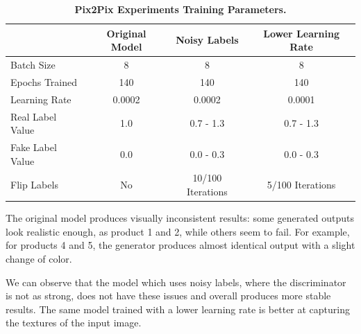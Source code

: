 \documentclass[12pt]{report}
\begin{document}
\begin{table}[h]
\centering
\begin{tabular}{@{}lccc@{}}
\toprule
                 & Original Model & Noisy Labels      & Lower Learning Rate \\ \midrule
Batch Size       & 8              & 8                 & 8                   \\
Epochs Trained   & 140            & 140               & 140                 \\
Learning Rate    & 0.0002         & 0.0002            & 0.0001              \\
Real Label Value & 1.0            & 0.7 - 1.3         & 0.7 - 1.3           \\
Fake Label Value & 0.0            & 0.0 - 0.3         & 0.0 - 0.3           \\
Flip Labels    & No             & 10/100 Iterations & 5/100 Iterations    \\ \bottomrule
\end{tabular}
\caption{\label{tab:pix2pix_exp} \textbf{Pix2Pix Experiments Training Parameters.}}
\end{table}

\pagebreak
The original model produces visually inconsistent results: some generated outputs look realistic enough, as product 1 and 2, while others seem to fail. For example, for products 4 and 5, the generator produces almost identical output with a slight change of color.

We can observe that the model which uses noisy labels, where the discriminator is not as strong, does not have these issues and overall produces more stable results. The same model trained with a lower learning rate is better at capturing the textures of the input image.
\end{document}
